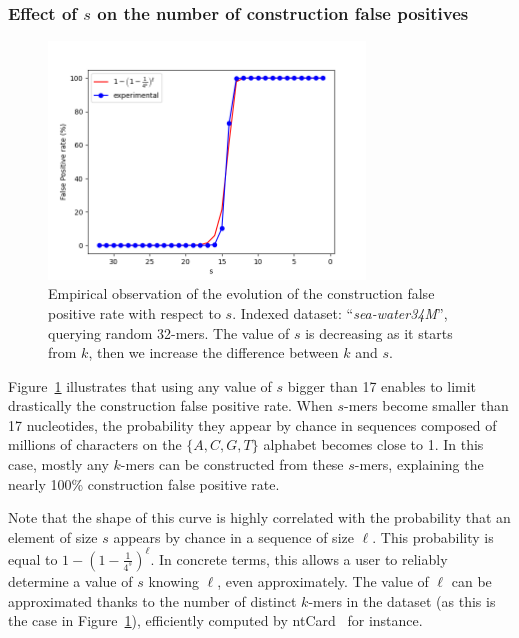 \subsubsection{Effect of $s$ on the number of construction false positives}
\begin{figure}[ht]
    \centering
   \includegraphics[width=0.75\textwidth]{figures/paperII/fig_fimpera_publi.png}
   \caption{Empirical observation of the evolution of the construction false positive rate with respect to $s$. Indexed dataset: ``\textit{sea-water34M}'', querying random 32-mers. The value of $s$ is decreasing as it starts from $k$, then we increase the difference between $k$ and $s$.}
   \label{fig:fimpera:cfp}
\end{figure}

Figure~\ref{fig:fimpera:cfp} illustrates that using any value of $s$ bigger than 17 enables to limit drastically the construction false positive rate. 
When $s$-mers become smaller than 17 nucleotides, the probability they appear by chance in sequences composed of millions of characters on the $\{A,C,G,T\}$ alphabet becomes close to 1. In this case, mostly any $k$-mers can be constructed from these $s$-mers, explaining the nearly 100\% construction false positive rate.

Note that the shape of this curve is highly correlated with the probability that an element of size $s$ appears by chance in a sequence of size $\ell$. This probability is equal to $1-\left(1-\frac{1}{4^s}\right)^\ell$. In concrete terms, this allows a user to reliably determine a value of $s$ knowing $\ell$, even approximately. The value of $\ell$ can be approximated thanks to the number of distinct $k$-mers in the dataset (as this is the case in Figure~\ref{fig:fimpera:cfp}), efficiently computed by ntCard~\cite{Mohamadi2017ntCardAS} for instance.

